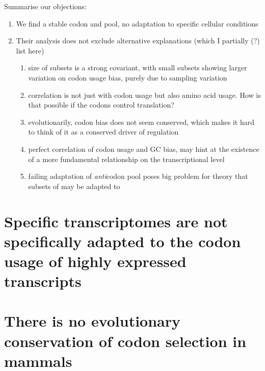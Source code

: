 Summarise our objections:

\begin{enumerate}
    \item We find a stable codon and \trna pool, no adaptation to specific cellular
conditions

    \item Their analysis does not exclude alternative explanations (which I partially
(?) list here)

        \begin{enumerate}
            \item size of \mrna subsets is a strong covariant, with small subsets
                showing larger variation on codon usage bias, purely due to
                sampling variation
            \item correlation is not just with codon usage but also amino acid
                usage. How is that possible if the codons control translation?
            \item evolutionarily, codon bias does not seem conserved, which
                makes it hard to think of it as a conserved driver of regulation
            \item perfect correlation of codon usage and GC bias, may hint at
                the existence of a more fundamental relationship on the
                transcriptional level
            \item failing adaptation of \emph{anti}codon pool poses big problem
                for theory that subsets of \mrna may be adapted to
        \end{enumerate}
\end{enumerate}

\section{Specific  transcriptomes are not specifically adapted to the
codon usage of highly expressed  transcripts}

\section{There is no evolutionary conservation of codon selection in mammals}
